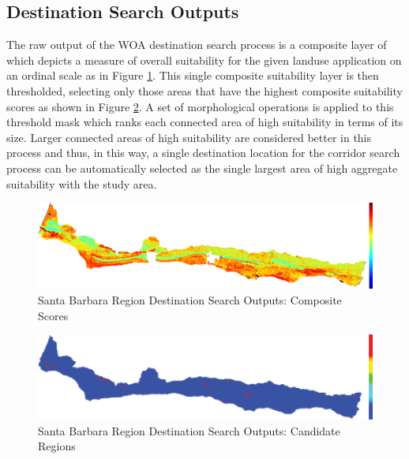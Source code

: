     \subsection{Destination Search Outputs}
    
The raw output of the WOA destination search process is a composite layer of which depicts a measure of overall suitability for the given landuse application on an ordinal scale as in Figure \ref{fig:SBdsoutputs_comp}. This single composite suitability layer is then thresholded, selecting only those areas that have the highest composite suitability scores as shown in Figure \ref{fig:SBdsoutputs_cand}. A set of morphological operations is applied to this threshold mask which ranks each connected area of high suitability in terms of its size. Larger connected areas of high suitability are considered better in this process and thus, in this way, a single destination location for the corridor search process can be automatically selected as the single largest area of high aggregate suitability with the study area. 
    
        \begin{figure}[!h]
            \begin{center}
            \includegraphics[width=5.5in]{figures/SantaBarbara_Search_Composite.png}   
            \caption{Santa Barbara Region Destination Search Outputs: Composite Scores}
            \label{fig:SBdsoutputs_comp}
            \end{center}
        \end{figure}
        
        \begin{figure}[!h]
            \begin{center}
            \includegraphics[width=5.5in]{figures/SantaBarbara_Search_Output.png}   
            \caption{Santa Barbara Region Destination Search Outputs: Candidate Regions}
            \label{fig:SBdsoutputs_cand}
            \end{center}
        \end{figure}

